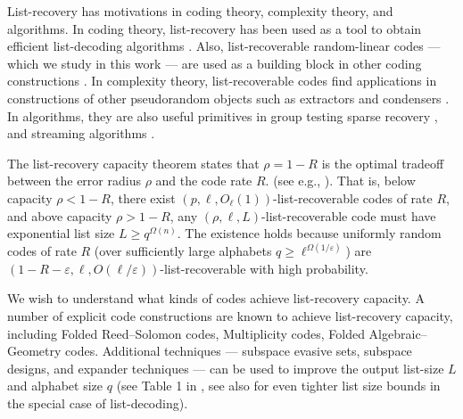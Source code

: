 \documentclass{article}
\begin{document}
List-recovery has motivations in coding theory, complexity theory, and algorithms.
In coding theory, list-recovery has been used as a tool to obtain efficient list-decoding algorithms \cite{guruswami1999improved,guruswami2008explicit,guruswami2013linearalgebraic,kopparty2015listdecoding,hemenway2019local}.
Also, list-recoverable random-linear codes --- which we study in this work --- are used as a building block in other coding constructions \cite{guruswami2001expanderbased,hemenway2018lineartime}.
In complexity theory, list-recoverable codes find applications in constructions of other pseudorandom objects such as extractors \cite{TZ04} and condensers \cite{GUV09}.
In algorithms, they are also useful primitives in group testing \cite{indyk2010efficiently,ngo2011efficiently} sparse recovery \cite{gilbert2013ell2}, and streaming algorithms \cite{larsen2019heavy,doron2020highprobability}. 

The list-recovery capacity theorem states that $\rho=1-R$ is the optimal tradeoff between the error radius $\rho$ and the code rate $R$. (see e.g., \cite{guruswami2019essential, resch2020list}).
That is, below capacity $\rho<1-R$, there exist $(p,\ell,O_\ell(1))$-list-recoverable codes of rate $R$, and above capacity $\rho>1-R$, any $(\rho,\ell,L)$-list-recoverable code must have exponential list size $L\ge q^{\Omega(n)}$.
The existence holds because uniformly random codes of rate $R$ (over sufficiently large alphabets $q\ge \ell^{\Omega(1/\varepsilon)}$) are $(1-R-\varepsilon,\ell,O(\ell/\varepsilon))$-list-recoverable with high probability.

We wish to understand what kinds of codes achieve list-recovery capacity.
A number of explicit code constructions are known to achieve list-recovery capacity, including Folded Reed--Solomon codes, Multiplicity codes, Folded Algebraic--Geometry codes. Additional techniques --- subspace evasive sets, subspace designs, and expander techniques --- can be used to improve the output list-size $L$ and alphabet size $q$ \cite{guruswami2008explicit,kopparty2015listdecoding,guruswami2013linearalgebraic,guruswami2012folded,guruswami2013list,hemenway2018lineartime,hemenway2019local,guruswami2016explicit,dvir2012subspace,kopparty2018improved,tamo2023tighter} (see Table 1 in \cite{kopparty2018improved}, see also \cite{srivastava2024improved, chen2024explicit} for even tighter list size bounds in the special case of list-decoding).
\end{document}
